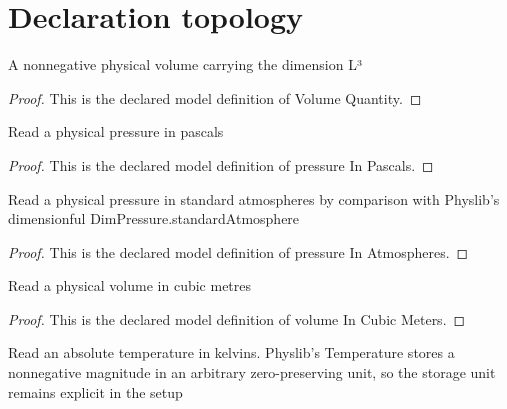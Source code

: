 \section{Declaration topology}
\begin{definition}
  \label{def:physics:phyx-mini-0469:phyxminiproblems-problemphyxmini0469-volumequantity}
  A nonnegative physical volume carrying the dimension L³
\end{definition}
\begin{proof}
  This is the declared model definition of Volume Quantity.
\end{proof}
\begin{definition}
  \label{def:physics:phyx-mini-0469:phyxminiproblems-problemphyxmini0469-pressureinpascals}
  Read a physical pressure in pascals
\end{definition}
\begin{proof}
  This is the declared model definition of pressure In Pascals.
\end{proof}
\begin{definition}
  \label{def:physics:phyx-mini-0469:phyxminiproblems-problemphyxmini0469-pressureinatmospheres}
  Read a physical pressure in standard atmospheres by comparison with Physlib's dimensionful DimPressure.standardAtmosphere
\end{definition}
\begin{proof}
  This is the declared model definition of pressure In Atmospheres.
\end{proof}
\begin{definition}
  \label{def:physics:phyx-mini-0469:phyxminiproblems-problemphyxmini0469-volumeincubicmeters}
  Read a physical volume in cubic metres
\end{definition}
\begin{proof}
  This is the declared model definition of volume In Cubic Meters.
\end{proof}
\begin{definition}
  \label{def:physics:phyx-mini-0469:phyxminiproblems-problemphyxmini0469-temperatureinkelvin}
  Read an absolute temperature in kelvins. Physlib's Temperature stores a nonnegative magnitude in an arbitrary zero-preserving unit, so the storage unit remains explicit in the setup
\end{definition}
